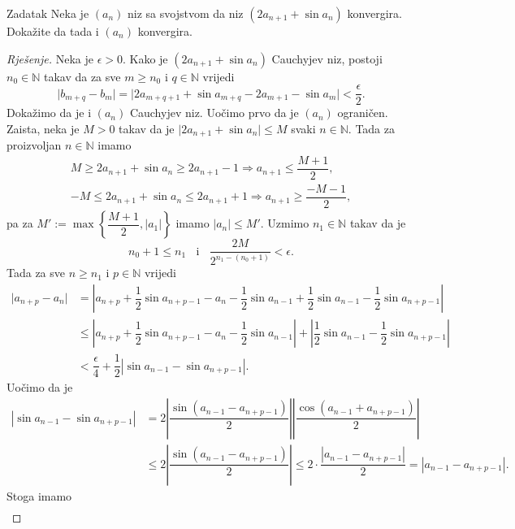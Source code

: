 \begin{exercise}{Zadatak}
Neka je $(a_n)$ niz sa svojstvom da niz
$\left(2a_{n+1}+\sin{a_n}\right)$ konvergira. Dokažite da tada i $(a_n)$ konvergira.
\end{exercise}
\begin{proof}[Rješenje]
Neka je $\epsilon>0$. Kako je $\left(2a_{n+1}+\sin{a_n}\right)$ Cauchyjev niz, postoji $n_0\in \mathbb{N}$ takav da za sve $m\geq n_0$ i $q\in \mathbb{N}$ vrijedi
$$\lvert b_{m+q}-b_m\rvert=\lvert 2a_{m+q+1}+\sin{a_{m+q}}-2a_{m+1}-\sin{a_m}\rvert<\dfrac{\epsilon}{2}.$$
Dokažimo da je i $(a_n)$ Cauchyjev niz. Uočimo prvo da je $(a_n)$ ograničen. Zaista, neka je $M>0$ takav da je $\lvert 2a_{n+1}+\sin{a_n}\rvert\leq M$ svaki $n\in \mathbb{N}$. Tada za proizvoljan $n\in \mathbb{N}$ imamo
\begin{gather*}
M\geq 2a_{n+1}+\sin{a_n}\geq 2{a_{n+1}}-1\Rightarrow a_{n+1}\leq \dfrac{M+1}{2},\\
-M\leq 2a_{n+1}+\sin{a_n}\leq 2a_{n+1}+1\Rightarrow a_{n+1}\geq \dfrac{-M-1}{2},
\end{gather*}
pa za $M':=\max{\left\{\dfrac{M+1}{2}, \lvert a_{1}\rvert\right\}}$ imamo $|a_n|\leq M'$. Uzmimo $n_1\in \mathbb{N}$ takav da je
$$n_0+1\leq n_1\;\;\text{ i }\;\;\dfrac{2M}{2^{n_1-(n_0+1)}}<\epsilon.$$
Tada za sve $n\geq n_1$ i $p\in \mathbb{N}$ vrijedi
\begin{align*}
\lvert a_{n+p}-a_{n}\rvert&=\left\lvert a_{n+p}+\dfrac{1}{2}\sin{a_{n+p-1}}-a_{n}-\dfrac{1}{2}\sin{a_{n-1}}+\dfrac{1}{2}\sin{a_{n-1}-\dfrac{1}{2}\sin{a_{n+p-1}}}\right\rvert\\
&\leq \left\lvert a_{n+p}+\dfrac{1}{2}\sin{a_{n+p-1}}-a_{n}-\dfrac{1}{2}\sin{a_{n-1}}\right\rvert+\left\lvert\dfrac{1}{2}\sin{a_{n-1}-\dfrac{1}{2}\sin{a_{n+p-1}}}\right\rvert\\
&<\dfrac{\epsilon}{4}+\dfrac{1}{2}\left\lvert\sin{a_{n-1}-\sin{a_{n+p-1}}}\right\rvert.
\end{align*}
Uočimo da je
\begin{align*}
\left\lvert\sin{a_{n-1}-\sin{a_{n+p-1}}}\right\rvert&=2\left\lvert \dfrac{\sin{\left(a_{n-1}-a_{n+p-1}\right)}}{2}\right\rvert\left\lvert \dfrac{\cos{\left(a_{n-1}+a_{n+p-1}\right)}}{2}\right\rvert\\
&\leq 2\left\lvert \dfrac{\sin{\left(a_{n-1}-a_{n+p-1}\right)}}{2}\right\rvert\leq 2\cdot \dfrac{\left\lvert a_{n-1}-a_{n+p-1}\right\rvert}{2}=\left\lvert a_{n-1}-a_{n+p-1}\right\rvert.
\end{align*}
Stoga imamo
\begin{align*}

\end{align*}
\end{proof}
